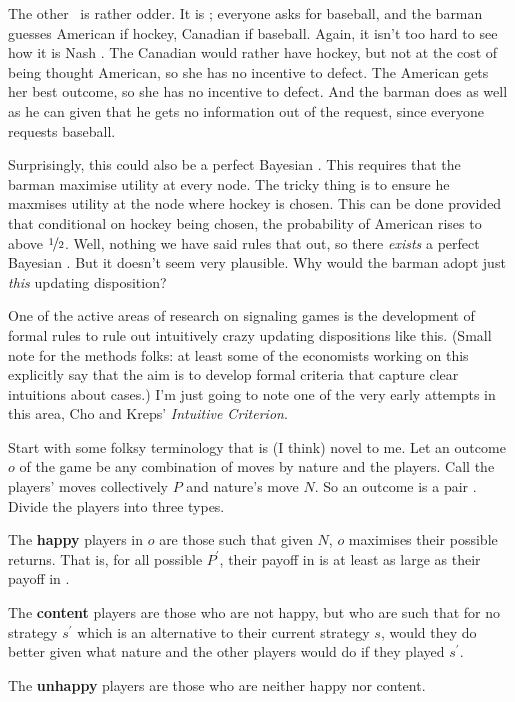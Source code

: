 The other \eqm\ is rather odder. It is ; everyone asks for baseball, and the barman guesses American if hockey, Canadian if baseball. Again, it isn't too hard to see how it is Nash \eqm. The Canadian would rather have hockey, but not at the cost of being thought American, so she has no incentive to defect. The American gets her best outcome, so she has no incentive to defect. And the barman does as well as he can given that he gets no information out of the request, since everyone requests baseball.

Surprisingly, this could also be a perfect Bayesian \eqm. This requires that the barman maximise utility at every node. The tricky thing is to ensure he maxmises utility at the node where hockey is chosen. This can be done provided that conditional on hockey being chosen, the probability of American rises to above  $\nicefrac{1}{2}$. Well, nothing we have said rules that out, so there \textit{exists} a perfect Bayesian \eqm. But it doesn't seem very plausible. Why would the barman adopt just \textit{this} updating disposition?

One of the active areas of research on signaling games is the development of formal rules to rule out intuitively crazy updating dispositions like this. (Small note for the methods folks: at least some of the economists working on this explicitly say that the aim is to develop formal criteria that capture clear intuitions about cases.) I'm just going to note one of the very early attempts in this area, Cho and Kreps' \textit{Intuitive Criterion}.

Start with some folksy terminology that is (I think) novel to me. Let an outcome $o$ of the game be any combination of moves by nature and the players. Call the players'  moves collectively $P$ and nature's move $N$. So an outcome is a pair . Divide the players into three types.

\begin{itemize*}
\item The \textbf{happy} players in $o$ are those such that given $N$, $o$ maximises their possible returns. That is, for all possible $P^\prime$, their payoff in  is at least as large as their payoff in .
\item The \textbf{content} players are those who are not happy, but who are such that for no strategy $s^\prime$ which is an alternative to their current strategy $s$, would they do better given what nature and the other players would do if they played $s^\prime$.
\item The \textbf{unhappy} players are those who are neither happy nor content.
\end{itemize*}

